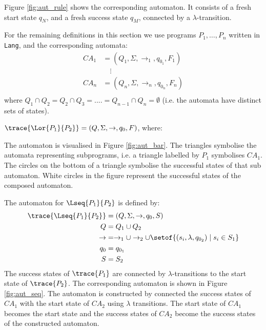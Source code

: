 Figure \ref{fig:aut_rule} shows the corresponding automaton. It consists of a fresh start state $q_N$, and a fresh success state $q_M$, connected by a $\lambda$-transition.

\fi
\iffull
For the remaining definitions in this section we use programs $P_1, \dotsc , P_n$ written in  {\tt Lang}, and the corresponding automata: \begin{align*}
CA_{1} &= (Q_1,\Sigma,\rightarrow_{1},q_{0_1},F_{1})\\
&\quad\vdots\\
CA_{n} &= (Q_n,\Sigma,\rightarrow_{n},q_{0_n},F_{n})\\
\end{align*} where $Q_1 \cap Q_2 = Q_2 \cap Q_3 = .... = Q_{n-1} \cap Q_n = \emptyset$ (i.e. the automata have distinct sets of states).
\fi
\iffull

\begin{definition}
$\trace{\Lor{P_1}{P_2}} = ( Q, \Sigma, \rightarrow, q_0, F)$, where:
\begin{itemize}
\item $Q = Q_{1} \cup Q_{2} \cup \{q_N\}, q_N \not\in Q_1 \cup Q_2$,
\item $\rightarrow = \rightarrow_{1} \cup \rightarrow_{2} \cup \{(q_{N}, \lambda, q_{0_1), (q_{N}, \lambda, q_{0_2})\}$,
\item $q_0 = q_N$,
\item $S = S_1 \cup S_2$.
\end{itemize}
\end{definition}

The automaton is visualised in Figure \ref{fig:aut_bar}. The triangles symbolise the automata representing subprograms, i.e. a triangle labelled by $P_1$ symbolises $CA_1$. The circles on the bottom of a triangle symbolise the successful states of that sub automaton. White circles in the figure represent the successful states of the composed automaton. 

\fi
\iffull
The automaton for $\Lseq{P_1}{P_2}$ is defined by:
\begin{align*}
\trace{\Lseq{P_1}{P_2}} &= ( Q, \Sigma, \rightarrow, q_0, S)\\
Q &= Q_{1} \cup Q_{2}\\
{\rightarrow} &= \rightarrow_{1} \cup \rightarrow_{2} 
					\cup \setof{(s_{i}, \lambda, q_{0_2}) \mid s_i \in S_1}\\
q_0 &= q_{0_1}\\
S &= S_2\\
\end{align*}
The success states of $\trace{P_1}$ are connected by $\lambda$-transitions to the start state of $\trace{P_2}$.
\fi
\iffull
The corresponding automaton is shown in Figure \ref{fig:aut_seq}. The automaton is constructed by connected the success states of $CA_1$ with the start state of $CA_2$ using $\lambda$ transitions. The start state of $CA_1$ becomes the start state and the success states of $CA_2$ become the success states of the constructed automaton.

